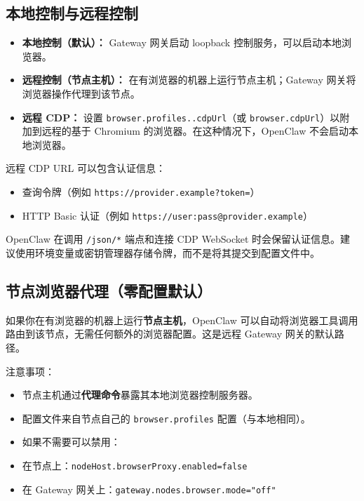 \subsection{本地控制与远程控制}


\begin{itemize}
  \item \textbf{本地控制（默认）：} Gateway 网关启动 loopback 控制服务，可以启动本地浏览器。
  \item \textbf{远程控制（节点主机）：} 在有浏览器的机器上运行节点主机；Gateway 网关将浏览器操作代理到该节点。
  \item \textbf{远程 CDP：} 设置 \texttt{browser.profiles..cdpUrl}（或 \texttt{browser.cdpUrl}）以附加到远程的基于 Chromium 的浏览器。在这种情况下，OpenClaw 不会启动本地浏览器。
\end{itemize}


远程 CDP URL 可以包含认证信息：

\begin{itemize}
  \item 查询令牌（例如 \texttt{https://provider.example?token=}）
  \item HTTP Basic 认证（例如 \texttt{https://user:pass@provider.example}）
\end{itemize}


OpenClaw 在调用 \texttt{/json/*} 端点和连接 CDP WebSocket 时会保留认证信息。建议使用环境变量或密钥管理器存储令牌，而不是将其提交到配置文件中。

\subsection{节点浏览器代理（零配置默认）}


如果你在有浏览器的机器上运行\textbf{节点主机}，OpenClaw 可以自动将浏览器工具调用路由到该节点，无需任何额外的浏览器配置。这是远程 Gateway 网关的默认路径。

注意事项：

\begin{itemize}
  \item 节点主机通过\textbf{代理命令}暴露其本地浏览器控制服务器。
  \item 配置文件来自节点自己的 \texttt{browser.profiles} 配置（与本地相同）。
  \item 如果不需要可以禁用：
  \item 在节点上：\texttt{nodeHost.browserProxy.enabled=false}
  \item 在 Gateway 网关上：\texttt{gateway.nodes.browser.mode="off"}
\end{itemize}


